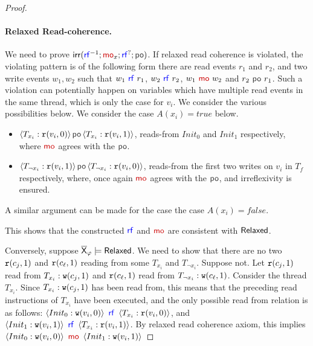 \begin{proof}
    \paragraph*{Relaxed Read-coherence.} We need to prove  $\irr(\rf^{-1}; \mo_x; \rf^{?}; \po)$. 
    If relaxed read coherence is violated, the violating pattern is of the following form there are read events $r_1$ and $r_2$, and two write events $w_1, w_2$ such that $w_1~\rf~r_1$, $w_2~\rf~r_2$, $w_1~\mo~w_2$ and $r_2~\po~r_1$.
    Such a violation can potentially happen on variables which have multiple read events in the same thread, which is only the case for $v_i$.
    We consider the various possibilities below. 
    We consider the case $A(x_i) = true$ below. 
        \begin{itemize}[leftmargin=0.1em]
            \item $\tuple{T_{x_i}: \rd(v_i, 0)} \po \tuple{T_{x_i}: \rd(v_i, 1)}$, reads-from $Init_0$ and $Init_1$ respectively, where $\mo$ agrees with the $\po$.
            \item $\tuple{T_{\neg x_i}: \rd(v_i, 1)} \po \tuple{T_{\neg x_i}: \rd(v_i, 0)}$, reads-from the first two writes on $v_i$ in $T_f$ respectively, where, once again $\mo$ agrees with the $\po$, and irreflexivity is ensured.
        \end{itemize}
        A similar argument can be made for the case the case $A(x_i) = false$.

    This shows that the constructed $\rf$ and $\mo$ are consistent with $\mathsf{Relaxed}$. 
    
    
    
    Conversely, suppose $\overline{\mathsf{\color{black}X}}_\varphi \models \mathsf{Relaxed}$. 
    We need to show that there are no two $\mathtt{r}(c_j, 1)$ and $\mathtt{r}(c_\ell, 1)$ reading from some $T_{x_i}$ and $T_{\neg x_i}$.
    Suppose not. 
    Let $\mathtt{r}(c_j, 1)$ read from $T_{x_i}: \mathtt{w}(c_j, 1)$ and $\mathtt{r}(c_\ell, 1)$ read from $T_{\neg x_i}: \mathtt{w}(c_\ell, 1)$.    
    Consider the thread $T_{x_i}$. Since $T_{x_i}: \mathtt{w}(c_j, 1)$ has been read from, this means that the preceding read instructions of $T_{x_i}$ have been executed, and the only possible read from relation is as follows: 
    $\tuple{Init_0: \wt(v_i, 0)}~\rf~\tuple{T_{x_i}: \rd(v_i, 0)}$,
    and $\tuple{Init_1: \wt(v_i, 1)}~\rf~\tuple{T_{x_i}: \rd(v_i, 1)}$. 
    By relaxed read coherence axiom, this implies $\tuple{Init_0: \wt(v_i, 0)} ~\mo~\tuple{Init_1: \wt(v_i, 1)}$    


\end{proof}
